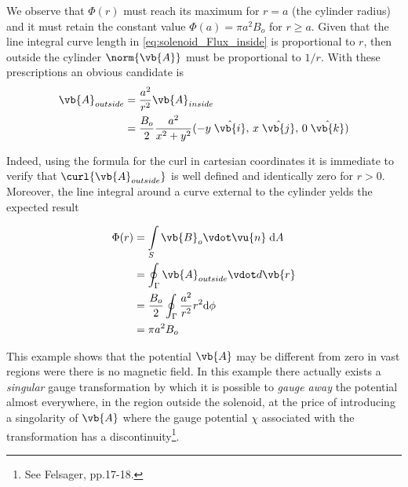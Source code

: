 We observe that $\Phi(r)$ must reach its maximum for $r = a$ (the cylinder radius) and it must retain the constant value $\Phi(a) = \pi a^2 B_o$ for $r \geq a$. Given that the line integral curve length in \ref{eq:solenoid_Flux_inside} is proportional to $r$, then outside the cylinder $\norm{\vb{A}}$ must be proportional to $1/r$. With these prescriptions an obvious candidate is 
\begin{equation}
\begin{aligned}
\vb{A}_{outside} &= \frac{a^2}{r^2} \vb{A}_{inside}  \\
				 &= \frac{B_o}{2} \frac{a^2}{x^2 + y^2} 
				  ( -y \;\hat{\vb{i}},\, x \;\hat{\vb{j}},\, 0  \; \hat{\vb{k}} ) 
\end{aligned}
\label{eq:solenoid_A_outside}
\end{equation}

Indeed, using the formula for the curl in cartesian coordinates it is immediate to verify that $\curl{\vb{A}_{outside}}$ is well defined and identically zero for $r > 0$. Moreover, the line integral around a curve external to the cylinder yelds the expected result

\begin{equation}
\begin{aligned}
\Phi(r) &= \int\limits_{S} \vb{B}_o \vdot \vu{n} \; \mathrm{d}A \\
&= \oint_{\Gamma} \vb{A}_{outside} \vdot d\vb{r} \\
&= \frac{B_o}{2} \oint_{\Gamma} \frac{a^2}{r^2} r^2 \mathrm{d}\phi \\
&= \pi a^2 B_{o} 
\end{aligned}
\label{eq:solenoid_Flux_outside} 
\end{equation}

This example shows that the potential $\vb{A}$ may be different from zero in vast regions were there is no magnetic field. In this example there actually exists a \textit{singular} gauge transformation by which it is possible to \textit{gauge away} the potential almost everywhere, in the region outside the solenoid, at the price of introducing a singolarity of $\vb{A}$ where the gauge potential $\chi$ associated with the transformation has a discontinuity\footnote{See Felsager, pp.17-18.}. 










  












 
